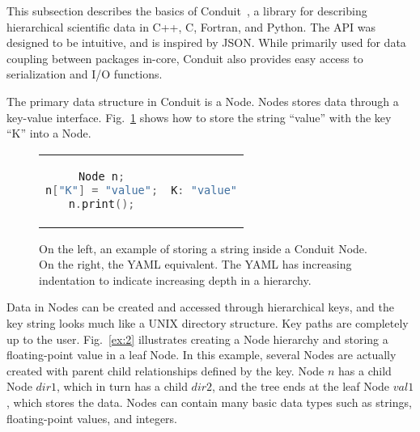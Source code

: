 This subsection describes the basics of Conduit~\cite{conduit_main}, a library for describing
hierarchical scientific data in C++, C, Fortran, and Python.
%
The API was designed to be intuitive, and is inspired by JSON.
%
While primarily used for data coupling between packages in-core,
Conduit also provides easy access to serialization and I/O functions.
%
%

The primary data structure in Conduit is a Node.
%
Nodes stores data through a key-value interface.
%
Fig.~\ref{ex:1} shows how to store the string ``value'' with the key ``K'' into a Node.

\begin{figure}
\begin{tabular}{cc}
  \begin{minipage}{.5\textwidth}
  \centering
    \begin{lstlisting}[language=C++]
Node n;
n["K"] = "value";
n.print();
    \end{lstlisting}
  \end{minipage}
  &
  \begin{minipage}{.5\textwidth}
  \centering
  \begin{lstlisting}[language=C++]
K: "value"
  \end{lstlisting}
  \end{minipage}
\end{tabular}
\caption{\label{ex:1}On the left, an example of storing a string inside a Conduit Node. On the right, the YAML equivalent.  The YAML has increasing indentation to indicate increasing depth in a hierarchy.}
\end{figure}

Data in Nodes can be created and accessed through hierarchical keys,
and the key string looks much like a UNIX directory structure.
%
Key paths are completely up to the user.
%
Fig.~\ref{ex:2} illustrates creating a Node hierarchy
and storing a floating-point value in a leaf Node.
%
In this example, several Nodes are actually created with parent child
relationships defined by the key.
%
Node $n$ has a child Node $dir1$, which in turn has a child $dir2$,
and the tree ends at the leaf Node $val1$, which stores the data.
%
Nodes can contain many basic data types such as strings,
floating-point values, and integers.

